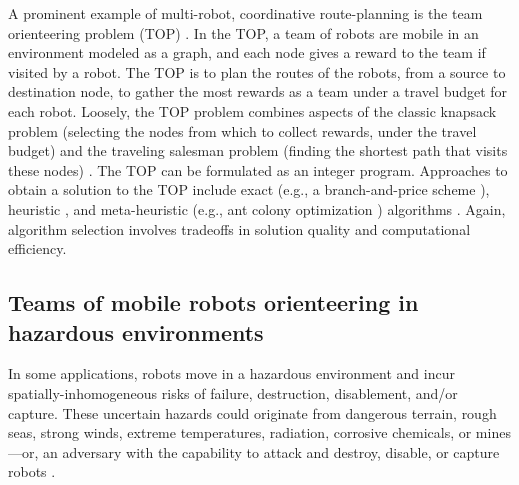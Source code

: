 \documentclass[fleqn,10pt,lineno]{wlpeerj}
\begin{document}
A prominent example of multi-robot, coordinative route-planning is the team orienteering \cite{golden1987orienteering} problem (TOP) \cite{chao1996team,gunawan2016orienteering,vansteenwegen2011orienteering}.
In the TOP, a team of robots are mobile in an environment modeled as a graph, and each node gives a reward to the team if visited by a robot.
The TOP is to plan the routes of the robots, from a source to destination node, to gather the most rewards as a team under a travel budget for each robot. 
Loosely, the TOP problem combines aspects of the classic knapsack problem (selecting the nodes from which to collect rewards, under the travel budget) and the traveling salesman problem (finding the shortest path that visits these nodes) \cite{vansteenwegen2011orienteering}.
The TOP can be formulated as an integer program.
Approaches to obtain a solution to the TOP include exact (e.g., a branch-and-price scheme \cite{boussier2007exact}), heuristic \cite{chao1996team}, and meta-heuristic (e.g., ant colony optimization \cite{ke2008ants}) algorithms \cite{vansteenwegen2011orienteering}. Again, algorithm selection involves tradeoffs in solution quality and computational efficiency. 

\subsection{Teams of mobile robots orienteering in hazardous environments} 
In some applications, robots move in a hazardous environment \cite{trevelyan2016robotics,trevelyan2016robotics} and incur spatially-inhomogeneous risks of failure, destruction, disablement, and/or capture. 
These uncertain hazards could originate from dangerous terrain, rough seas, strong winds, extreme temperatures, radiation, corrosive chemicals, or mines---or, an adversary with the capability to attack and destroy, disable, or capture robots \cite{agmon2017robotic}. 
\end{document}
